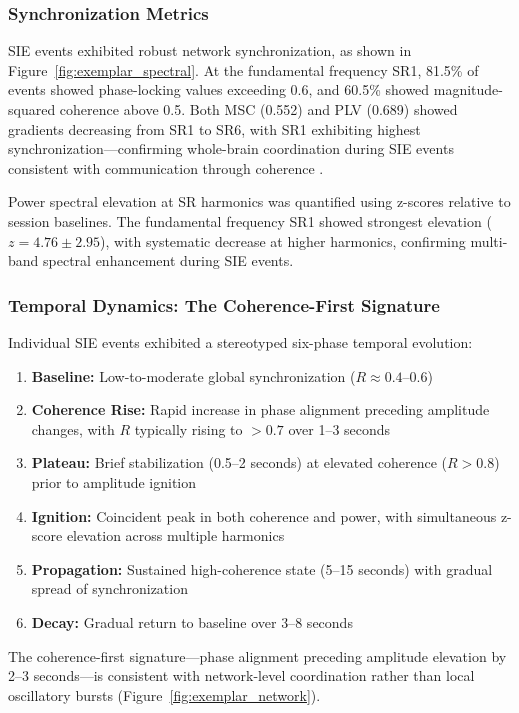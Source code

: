 \documentclass[11pt,a4paper]{article}
\begin{document}
\subsubsection{Synchronization Metrics}
SIE events exhibited robust network synchronization, as shown in Figure~\ref{fig:exemplar_spectral}. At the fundamental frequency SR1, 81.5\% of events showed phase-locking values exceeding 0.6, and 60.5\% showed magnitude-squared coherence above 0.5. Both MSC (0.552) and PLV (0.689) showed gradients decreasing from SR1 to SR6, with SR1 exhibiting highest synchronization---confirming whole-brain coordination during SIE events consistent with communication through coherence \parencite{pascal_fries_7b9d1ced}.

Power spectral elevation at SR harmonics was quantified using z-scores relative to session baselines. The fundamental frequency SR1 showed strongest elevation ($z = 4.76 \pm 2.95$), with systematic decrease at higher harmonics, confirming multi-band spectral enhancement during SIE events.

\subsubsection{Temporal Dynamics: The Coherence-First Signature}
Individual SIE events exhibited a stereotyped six-phase temporal evolution:
\begin{enumerate}
    \item \textbf{Baseline:} Low-to-moderate global synchronization ($R \approx 0.4$--$0.6$)
    \item \textbf{Coherence Rise:} Rapid increase in phase alignment preceding amplitude changes, with $R$ typically rising to $>0.7$ over 1--3 seconds
    \item \textbf{Plateau:} Brief stabilization (0.5--2 seconds) at elevated coherence ($R > 0.8$) prior to amplitude ignition
    \item \textbf{Ignition:} Coincident peak in both coherence and power, with simultaneous z-score elevation across multiple harmonics
    \item \textbf{Propagation:} Sustained high-coherence state (5--15 seconds) with gradual spread of synchronization
    \item \textbf{Decay:} Gradual return to baseline over 3--8 seconds
\end{enumerate}

The coherence-first signature---phase alignment preceding amplitude elevation by 2--3 seconds---is consistent with network-level coordination rather than local oscillatory bursts \parencite{varela2001brainweb} (Figure~\ref{fig:exemplar_network}).
\end{document}
